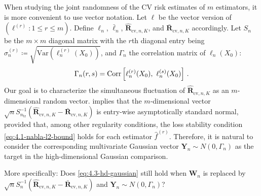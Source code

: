 \documentclass[11pt]{article}
\theoremstyle{plain}
\newcommand{\cv}{{\mathrm{cv}}}
\newcommand{\tr}{{\mathrm{tr}}}
\newcommand{\var}{\mathrm{Var}}
\begin{document}
When studying the joint randomness of the CV risk estimates of $m$ estimators, it is more convenient to use vector notation. Let $\boldsymbol{\ell}$ be the vector version of $(\ell^{(r)}:1\le r\le m)$. Define $\boldsymbol{\ell}_n$, $\bar{\boldsymbol{\ell}}_n$, $\hat{\mathbf R}_{\cv,n,K}$, and $\bar{\mathbf R}_{\cv,n,K}$ accordingly.
Let  $S_n$ be the $m\times m$ diagonal matrix with the $r$th diagonal entry being $\sigma_n^{(r)}\coloneqq \sqrt{\var(\ell_n^{(r)}(X_0))}$, and $\Gamma_n$ the correlation matrix of $\boldsymbol{\ell}_n(X_0)$:
\begin{equation}
    \label{eq:4.3-cov-mat-rand}
    \Gamma_n(r,s) = 
        {\rm Corr}\left[\ell_n^{(r)}(X_0),~\ell_n^{(s)}(X_0)\right]\,.
\end{equation}
Our goal is to characterize the simultaneous fluctuation of $\hat{\mathbf R}_{\cv,n,K}$ as an $m$-dimensional random vector.
 implies that the $m$-dimensional vector $\sqrt{n}S_{n_\tr}^{-1}(\hat{\mathbf R}_{\cv,n,K}-\bar{\mathbf R}_{\cv,n,K})$
is entry-wise asymptotically standard normal, provided that, among other regularity conditions, the loss stability condition \eqref{eq:4.1-nabla-l2-bound} holds for each estimator $\hat f^{(r)}$.  Therefore, it is natural to consider the corresponding multivariate Gaussian vector $\mathbf Y_n\sim N(0,\Gamma_n)$ as the target in the high-dimensional Gaussian comparison. 

More specifically:
Does \eqref{eq:4.3-hd-gaussian} still hold when $\mathbf W_n$ is replaced by 
$\sqrt{n}S_n^{-1}(\hat{\mathbf R}_{\cv,n,K}-\bar{\mathbf R}_{\cv,n,K})$ and $\mathbf Y_n\sim N(0,\Gamma_n)$?
\end{document}
